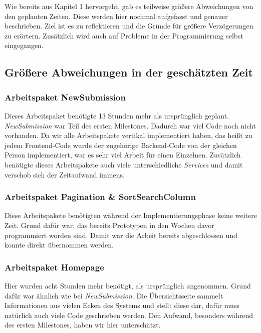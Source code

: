 
Wie bereits aus Kapitel 1 hervorgeht, gab es teilweise größere Abweichungen von den geplanten Zeiten. Diese werden hier nochmal aufgefasst und genauer beschrieben. Ziel ist es zu reflektieren und die Gründe für größere Verzögerungen zu erörtern. Zusätzlich wird auch auf Probleme in der Programmierung selbst eingegangen.

\subsection{Größere Abweichungen in der geschätzten Zeit}

\subsubsection{Arbeitspaket NewSubmission}

Dieses Arbeitspaket benötigte 13 Stunden mehr als ursprünglich geplant.
\emph{NewSubmission} war Teil des ersten Milestones. Dadurch war viel Code noch nicht vorhanden. Da wir alle Arbeitspakete vertikal implementiert haben, das heißt zu jedem Frontend-Code wurde der zugehörige Backend-Code von der gleichen Person implementiert, war es sehr viel Arbeit für einen Einzelnen. Zusätzlich benötigte dieses Arbeitspakete auch viele unterschiedliche \emph{Services} und damit verschob sich der Zeitaufwand immens.

\subsubsection{Arbeitspaket Pagination \& SortSearchColumn}

Diese Arbeitspakete benötigten während der Implementierungsphase keine weitere Zeit. Grund dafür war, das bereits Prototypen in den Wochen davor programmiert worden sind. Damit war die Arbeit bereits abgeschlossen und konnte direkt übernommen werden.

\subsubsection{Arbeitspaket Homepage}

Hier wurden acht Stunden mehr benötigt, als ursprünglich angenommen. Grund dafür war ähnlich wie bei \emph{NewSubmission}. Die Übersichtsseite sammelt Informationen aus vielen Ecken des Systems und stellt diese dar, dafür muss natürlich auch viele Code geschrieben werden. Den Aufwand, besonders während des ersten Milestones, haben wir hier unterschätzt.

